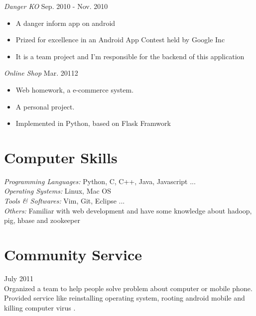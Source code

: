 \documentclass[line,margin]{res}
\begin{document}
\begin{resume}
{\sl Danger KO} \hfill Sep. 2010 - Nov. 2010 
    \begin{itemize} \itemsep -2pt
    \item A danger inform app on android
    \item Prized for excellence in an Android App Contest held by Google Inc
    \item It is a team project and I'm responsible for the backend of this
          application
    \end{itemize}

{\sl Online Shop} \hfill Mar. 20112 
    \begin{itemize} \itemsep -2pt
    \item Web homework, a e-commerce system.
    \item A personal project.
    \item Implemented in Python, based on Flask Framwork
    \end{itemize}
 
\section{Computer Skills}
{\sl Programming Languages: } Python, C, C++, Java, Javascript ...\\
{\sl Operating Systems:} Linux, Mac OS\\
{\sl Tools \& Softwares:} Vim, Git, Eclipse ...\\
{\sl Others:} Familiar with web development and have some knowledge about
              hadoop, pig, hbase and zookeeper
 
\section{Community Service}  \hfill July 2011\\
  Organized a team to help people solve problem about computer or mobile
  phone.\\
  Provided service like reinstalling operating system, rooting android mobile
  and killing computer virus .

\end{resume}
\end{document}
